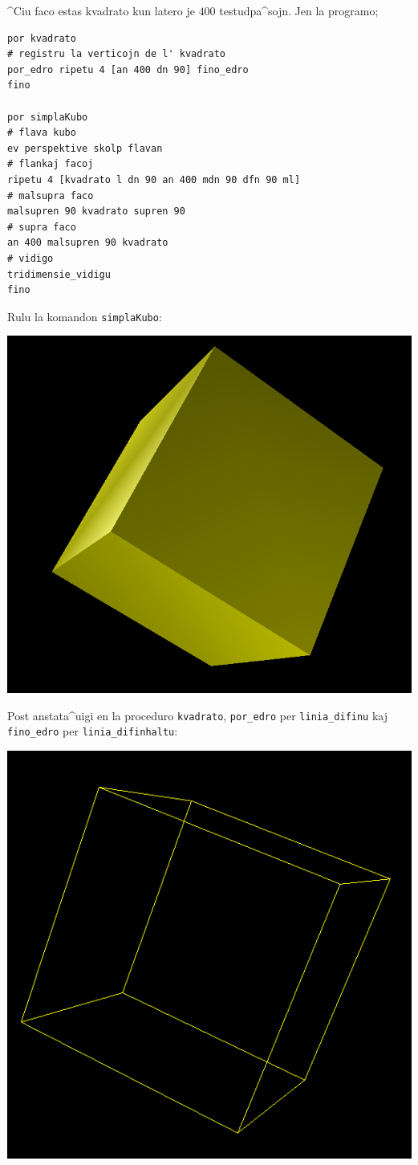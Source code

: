 ^Ciu faco estas kvadrato kun latero je $400$ testudpa^sojn.  Jen la programo;
\begin{verbatim}
por kvadrato
# registru la verticojn de l' kvadrato
por_edro ripetu 4 [an 400 dn 90] fino_edro
fino

por simplaKubo
# flava kubo
ev perspektive skolp flavan
# flankaj facoj
ripetu 4 [kvadrato l dn 90 an 400 mdn 90 dfn 90 ml]
# malsupra faco
malsupren 90 kvadrato supren 90
# supra faco
an 400 malsupren 90 kvadrato
# vidigo
tridimensie_vidigu
fino
\end{verbatim}
Rulu la komandon \texttt{simplaKubo}:
\begin{center}
\includegraphics*[scale=0.4]{bildoj/3dCube1.png}
\end{center}
Post anstata^uigi en la proceduro \texttt{kvadrato},
\texttt{por\_edro} per \texttt{linia\_difinu} kaj \texttt{fino\_edro}
per \texttt{linia\_difinhaltu}:
\begin{center}
\includegraphics*[scale=0.4]{bildoj/3dCube2.png}
\end{center}
